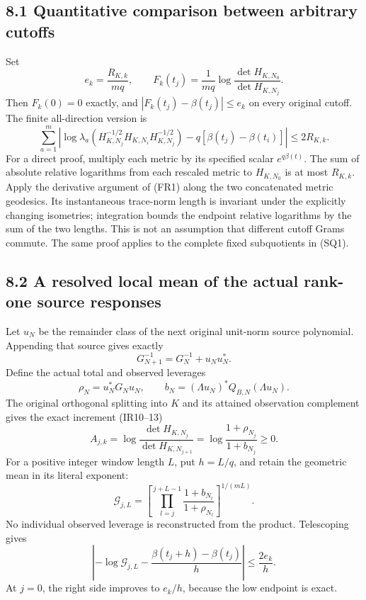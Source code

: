 \documentclass[10pt]{article}
\begin{document}
\subsection{8.1 Quantitative comparison between arbitrary cutoffs}\label{quantitative-comparison-between-arbitrary-cutoffs}

Set \[
 e_k=\frac{R_{K,k}}{mq},\qquad
 F_k(t_j)=\frac1{mq}\log\frac{\det H_{K,N_0}}{\det H_{K,N_j}}.
\] Then \(F_k(0)=0\) exactly, and \(|F_k(t_j)-\beta(t_j)|\le e_k\) on every original cutoff. The finite all-direction version is \[
 \boxed{\sum_{a=1}^m
 \left|\log\lambda_a(H_{K,N_j}^{-1/2}H_{K,N_i}H_{K,N_j}^{-1/2})
 -q[\beta(t_j)-\beta(t_i)]\right|\le2R_{K,k}.}
 \tag{ME1}
\] For a direct proof, multiply each metric by its specified scalar \(e^{q\beta(t)}\). The sum of absolute relative logarithms from each rescaled metric to \(H_{K,N_0}\) is at most \(R_{K,k}\). Apply the derivative argument of (FR1) along the two concatenated metric geodesics. Its instantaneous trace-norm length is invariant under the explicitly changing isometries; integration bounds the endpoint relative logarithms by the sum of the two lengths. This is not an assumption that different cutoff Grams commute. The same proof applies to the complete fixed subquotients in (SQ1).

\subsection{8.2 A resolved local mean of the actual rank-one source responses}\label{a-resolved-local-mean-of-the-actual-rank-one-source-responses}

Let \(u_N\) be the remainder class of the next original unit-norm source polynomial. Appending that source gives exactly \[
 G_{N+1}^{-1}=G_N^{-1}+u_Nu_N^*.
\] Define the actual total and observed leverages \[
 \rho_N=u_N^*G_Nu_N,\qquad
 b_N=(\Lambda u_N)^*Q_{B,N}(\Lambda u_N).
\] The original orthogonal splitting into \(K\) and its attained observation complement gives the exact increment (IR10--13) \[
 A_{j,k}=\log\frac{\det H_{K,N_j}}{\det H_{K,N_{j+1}}}
 =\log\frac{1+\rho_{N_j}}{1+b_{N_j}}\ge0.
 \tag{ME2}
\] For a positive integer window length \(L\), put \(h=L/q\), and retain the geometric mean in its literal exponent: \[
 \mathcal G_{j,L}
 =\left[\prod_{l=j}^{j+L-1}
 \frac{1+b_{N_l}}{1+\rho_{N_l}}\right]^{1/(mL)}.
\] No individual observed leverage is reconstructed from the product. Telescoping gives \[
 \boxed{\left|-\log\mathcal G_{j,L}
 -\frac{\beta(t_j+h)-\beta(t_j)}{h}\right|
 \le\frac{2e_k}{h}.}
 \tag{ME3}
\] At \(j=0\), the right side improves to \(e_k/h\), because the low endpoint is exact.
\end{document}
